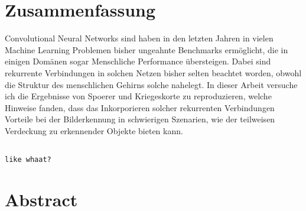 \section*{Zusammenfassung}
Convolutional Neural Networks sind haben in den letzten Jahren in vielen Machine Learning Problemen bisher ungeahnte Benchmarks ermöglicht, die in einigen Domänen sogar Menschliche Performance übersteigen. Dabei sind rekurrente Verbindungen in solchen Netzen bisher selten beachtet worden, obwohl die Struktur des menschlichen Gehirns solche nahelegt. In dieser Arbeit versuche ich die Ergebnisse von Spoerer und Kriegeskorte {} zu reproduzieren, welche Hinweise fanden, dass das Inkorporieren solcher rekurrenten Verbindungen Vorteile bei der Bilderkennung in schwierigen Szenarien, wie der teilweisen Verdeckung zu erkennender Objekte bieten kann.

\begin{verbatim}

like whaat?

\end{verbatim}

\section*{Abstract}
